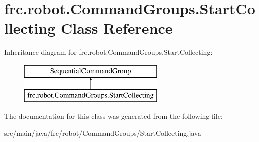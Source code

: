 \hypertarget{classfrc_1_1robot_1_1_command_groups_1_1_start_collecting}{}\section{frc.\+robot.\+Command\+Groups.\+Start\+Collecting Class Reference}
\label{classfrc_1_1robot_1_1_command_groups_1_1_start_collecting}
Inheritance diagram for frc.\+robot.\+Command\+Groups.\+Start\+Collecting\+:\begin{figure}[H]
\begin{center}
\leavevmode
\includegraphics[height=2.000000cm]{classfrc_1_1robot_1_1_command_groups_1_1_start_collecting}
\end{center}
\end{figure}


The documentation for this class was generated from the following file\+:\begin{DoxyCompactItemize}
\item 
src/main/java/frc/robot/\+Command\+Groups/Start\+Collecting.\+java\end{DoxyCompactItemize}
